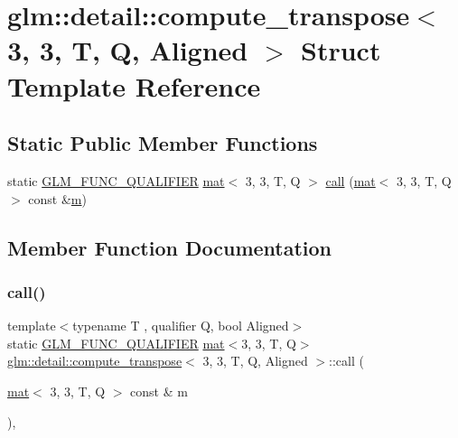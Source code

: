 \hypertarget{structglm_1_1detail_1_1compute__transpose_3_013_00_013_00_01_t_00_01_q_00_01_aligned_01_4}{}\section{glm\+:\+:detail\+:\+:compute\+\_\+transpose$<$ 3, 3, T, Q, Aligned $>$ Struct Template Reference}
\label{structglm_1_1detail_1_1compute__transpose_3_013_00_013_00_01_t_00_01_q_00_01_aligned_01_4}
\subsection*{Static Public Member Functions}
\begin{DoxyCompactItemize}
\item 
static \mbox{\hyperlink{setup_8hpp_a33fdea6f91c5f834105f7415e2a64407}{G\+L\+M\+\_\+\+F\+U\+N\+C\+\_\+\+Q\+U\+A\+L\+I\+F\+I\+ER}} \mbox{\hyperlink{structglm_1_1mat}{mat}}$<$ 3, 3, T, Q $>$ \mbox{\hyperlink{structglm_1_1detail_1_1compute__transpose_3_013_00_013_00_01_t_00_01_q_00_01_aligned_01_4_a4eec6b706e425647b7e49b24312a7e8f}{call}} (\mbox{\hyperlink{structglm_1_1mat}{mat}}$<$ 3, 3, T, Q $>$ const \&\mbox{\hyperlink{_s_d_l__opengl__glext_8h_af593500c283bf1a787a6f947f503a5c2}{m}})
\end{DoxyCompactItemize}


\subsection{Member Function Documentation}
\mbox{\label{structglm_1_1detail_1_1compute__transpose_3_013_00_013_00_01_t_00_01_q_00_01_aligned_01_4_a4eec6b706e425647b7e49b24312a7e8f}} 
\subsubsection{\texorpdfstring{call()}{call()}}
{\footnotesize\ttfamily template$<$typename T , qualifier Q, bool Aligned$>$ \\
static \mbox{\hyperlink{setup_8hpp_a33fdea6f91c5f834105f7415e2a64407}{G\+L\+M\+\_\+\+F\+U\+N\+C\+\_\+\+Q\+U\+A\+L\+I\+F\+I\+ER}} \mbox{\hyperlink{structglm_1_1mat}{mat}}$<$3, 3, T, Q$>$ \mbox{\hyperlink{structglm_1_1detail_1_1compute__transpose}{glm\+::detail\+::compute\+\_\+transpose}}$<$ 3, 3, T, Q, Aligned $>$\+::call (\begin{DoxyParamCaption}\item[{\mbox{\hyperlink{structglm_1_1mat}{mat}}$<$ 3, 3, T, Q $>$ const \&}]{m }\end{DoxyParamCaption})\hspace{0.3cm}{\ttfamily [inline]}, {\ttfamily [static]}}




